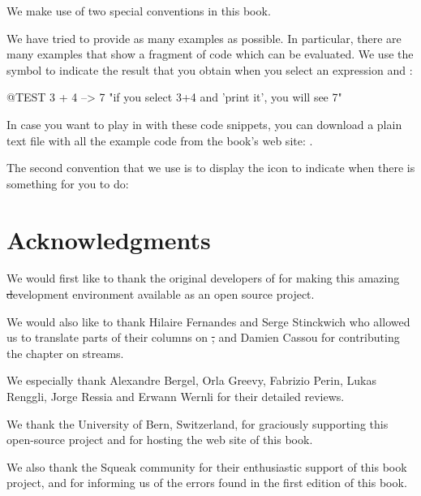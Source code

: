 \documentclass[a4paper,spanish, 10pt,twoside]{book}
\begin{document}
We make use of two special conventions in this book.

We have tried to provide as many examples as possible.
In particular, there are many examples that show a fragment of code which can be evaluated.  We use the symbol \ct{-->} to indicate the result that you obtain when you select an expression and :

\begin{code}{@TEST}
3 + 4 --> 7    "if you select 3+4 and 'print it', you will see 7"
\end{code}

In case you want to play in \pharo with these code snippets, you can download a plain text file with all the example code from the book's web site: \pbe.

The second convention that we use is to display the icon \dothisicon{} to indicate when there is something for you to do:


\section*{Acknowledgments}

We would first like to thank the original developers of \squeak for making this amazing \st development environment available as an open source project.

We would also like to thank Hilaire Fernandes and Serge Stinckwich who allowed us to translate parts of their columns on \st, and Damien Cassou for contributing the chapter on streams.

We especially thank Alexandre Bergel, Orla Greevy, Fabrizio Perin, Lukas Renggli, Jorge Ressia and Erwann Wernli for their detailed reviews.

We thank the University of Bern, Switzerland, for graciously supporting this open-source project and for hosting the web site of this book.

We also thank the Squeak community for their enthusiastic support of this book project, and for informing us of the errors found in the first edition of this book.

\ifx\wholebook\relax\else
   
   
\end{document}
